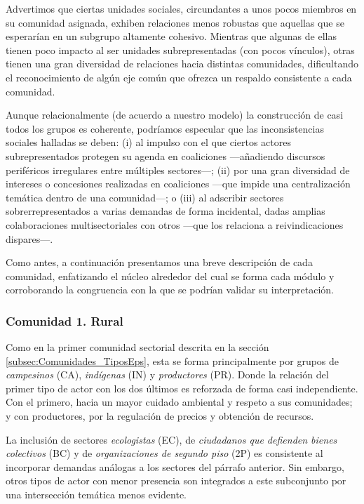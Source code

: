\documentclass[letterpaper, 11pt]{book}
\theoremstyle{definition}
\theoremstyle{remark}
\begin{document}
Advertimos que ciertas unidades sociales, circundantes a unos pocos miembros en su comunidad asignada, exhiben relaciones menos robustas que aquellas que se esperarían en un subgrupo altamente cohesivo. 
Mientras que algunas de ellas tienen poco impacto al ser unidades subrepresentadas (con pocos vínculos), otras tienen una gran diversidad de relaciones hacia distintas comunidades, dificultando el reconocimiento de algún eje común que ofrezca un respaldo consistente a cada comunidad. 


Aunque relacionalmente (de acuerdo a nuestro modelo) la construcción de casi todos los grupos es coherente, podríamos especular que las inconsistencias sociales halladas se deben: 
(i) al impulso con el que ciertos actores subrepresentados protegen su agenda en coaliciones ---añadiendo discursos periféricos irregulares entre múltiples sectores---; 
(ii) por una gran diversidad de intereses o concesiones realizadas en coaliciones ---que impide una centralización temática dentro de una comunidad---; 
o (iii) al adscribir sectores sobrerrepresentados a varias demandas de forma incidental, dadas amplias colaboraciones multisectoriales con otros ---que los relaciona a reivindicaciones dispares---. 


Como antes, a continuación presentamos una breve descripción de cada comunidad, enfatizando el núcleo alrededor del cual se forma cada módulo y corroborando la congruencia con la que se podrían validar su interpretación. 





\subsubsection{Comunidad 1. Rural}
\label{subsubsec3:comunidad2}

Como en la primer comunidad sectorial descrita en la sección \ref{subsec:Comunidades_TiposEps}, esta se forma principalmente por grupos de \emph{campesinos} (CA), \emph{indígenas} (IN) y \emph{productores} (PR). 
Donde la relación del primer tipo de actor con los dos últimos es reforzada de forma casi independiente. 
Con el primero, hacia un mayor cuidado ambiental y respeto a sus comunidades; y con productores, por la regulación de precios y obtención de recursos. 


La inclusión de sectores \emph{ecologistas} (EC), de \emph{ciudadanos que defienden bienes colectivos} (BC) y de \emph{organizaciones de segundo piso} (2P) es consistente al incorporar demandas análogas a los sectores del párrafo anterior. 
Sin embargo, otros tipos de actor con menor presencia son integrados a este subconjunto por una intersección temática menos evidente.
\end{document}
